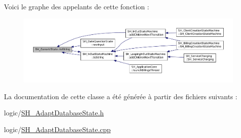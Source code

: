 Voici le graphe des appelants de cette fonction \-:
\nopagebreak
\begin{figure}[H]
\begin{center}
\leavevmode
\includegraphics[width=350pt]{classSH__GenericState_a5480c5ee725fd801d8f6292cd4c803b8_icgraph}
\end{center}
\end{figure}




La documentation de cette classe a été générée à partir des fichiers suivants \-:\begin{DoxyCompactItemize}
\item 
logic/\hyperlink{SH__AdaptDatabaseState_8h}{S\-H\-\_\-\-Adapt\-Database\-State.\-h}\item 
logic/\hyperlink{SH__AdaptDatabaseState_8cpp}{S\-H\-\_\-\-Adapt\-Database\-State.\-cpp}\end{DoxyCompactItemize}
